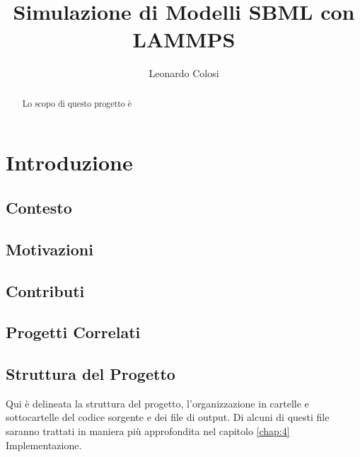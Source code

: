 \documentclass[Lau, oneside]{sapthesis}
\title{Simulazione di Modelli SBML con LAMMPS}
\author{Leonardo Colosi}
\begin{document}
\frontmatter
\maketitle

\begin{abstract}

Lo scopo di questo progetto \`e
\end{abstract}

\tableofcontents
\mainmatter

\chapter{Introduzione}
\label{chap:1}



\newpage
\section{Contesto}
\label{sec:ctx}

\newpage
\section{Motivazioni}
\label{sec:mtv}

\newpage
\section{Contributi}
\label{sec:ctb}

\newpage
\section{Progetti Correlati}
\label{sec:rlt}

\newpage
\section{Struttura del Progetto}
\label{sec:stprj}
Qui \`e delineata la struttura del progetto, l'organizzazione in cartelle e sottocartelle del codice sorgente e dei file di output. Di alcuni di questi file saranno trattati in maniera più approfondita nel capitolo \ref{chap:4} Implementazione. \\
\end{document}
